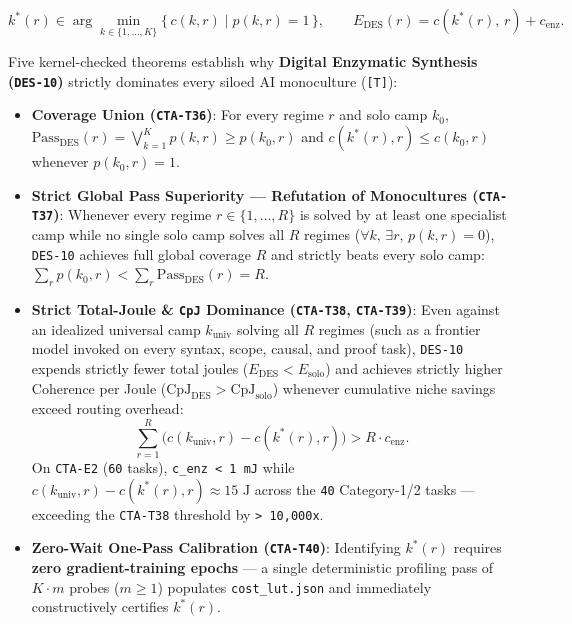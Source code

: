\documentclass[10pt,letterpaper]{article}
\providecommand{\tightlist}{\setlength{\itemsep}{1pt}\setlength{\parskip}{0pt}}
\begin{document}
\[k^*(r) \in \arg\min_{k \in \{1,\dots,K\}} \bigl\{\, c(k, r) \;\big|\; p(k, r) = 1 \,\bigr\}, \qquad E_{\text{DES}}(r) = c\!\left(k^*(r),\, r\right) + c_{\text{enz}}.\]

Five kernel-checked theorems establish why \textbf{Digital Enzymatic
Synthesis (\texttt{DES-10})} strictly dominates every siloed AI
monoculture (\texttt{{[}T{]}}):

\begin{itemize}
\tightlist
\item
  \textbf{Coverage Union (\texttt{CTA-T36})}: For every regime \(r\) and
  solo camp \(k_0\),
  \(\mathrm{Pass}_{\text{DES}}(r) = \bigvee_{k=1}^K p(k, r) \ge p(k_0, r)\)
  and \(c(k^*(r), r) \le c(k_0, r)\) whenever \(p(k_0, r) = 1\).
\item
  \textbf{Strict Global Pass Superiority --- Refutation of Monocultures
  (\texttt{CTA-T37})}: Whenever every regime \(r \in \{1,\dots,R\}\) is
  solved by at least one specialist camp while no single solo camp
  solves all \(R\) regimes (\(\forall k,\, \exists r,\, p(k, r) = 0\)),
  \texttt{DES-10} achieves full global coverage \(R\) and strictly beats
  every solo camp:
  \(\sum_r p(k_0, r) < \sum_r \mathrm{Pass}_{\text{DES}}(r) = R\).
\item
  \textbf{Strict Total-Joule \& \texttt{CpJ} Dominance
  (\texttt{CTA-T38}, \texttt{CTA-T39})}: Even against an idealized
  universal camp \(k_{\text{univ}}\) solving all \(R\) regimes (such as
  a frontier model invoked on every syntax, scope, causal, and proof
  task), \texttt{DES-10} expends strictly fewer total joules
  (\(E_{\text{DES}} < E_{\text{solo}}\)) and achieves strictly higher
  Coherence per Joule
  (\(\mathrm{CpJ}_{\text{DES}} > \mathrm{CpJ}_{\text{solo}}\)) whenever
  cumulative niche savings exceed routing overhead:
  \[\sum_{r=1}^{R} \bigl(c(k_{\text{univ}}, r) - c(k^*(r), r)\bigr) > R \cdot c_{\text{enz}}.\]
  On \texttt{CTA-E2} (\texttt{60} tasks),
  \texttt{c\_enz\ \textless{}\ 1\ mJ} while
  \(c(k_{\text{univ}}, r) - c(k^*(r), r) \approx 15\text{ J}\) across
  the \texttt{40} Category-1/2 tasks --- exceeding the \texttt{CTA-T38}
  threshold by \texttt{\textgreater{}\ 10,000x}.
\item
  \textbf{Zero-Wait One-Pass Calibration (\texttt{CTA-T40})}:
  Identifying \(k^*(r)\) requires \textbf{zero gradient-training epochs}
  --- a single deterministic profiling pass of \(K \cdot m\) probes
  (\(m \ge 1\)) populates \texttt{cost\_\allowbreak{}lut.\allowbreak{}json} and immediately
  constructively certifies \(k^*(r)\).
\end{itemize}
\end{document}
